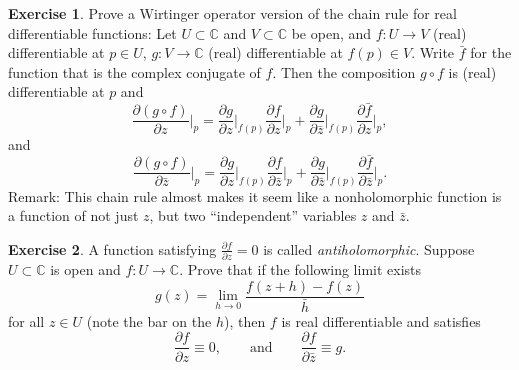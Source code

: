 \documentclass[12pt,openany]{book}
\newcommand{\C}{{\mathbb{C}}}
\newcommand{\myindex}[1]{#1\index{#1}}
\newcommand{\myquote}[1]{``#1''}
\theoremstyle{plain}
\theoremstyle{remark}
\theoremstyle{definition}
\newenvironment{exbox}{%
    \def\FrameCommand{\vrule width 1pt \relax\hspace{10pt}}%
    \MakeFramed{\advance\hsize-\width\FrameRestore}%
}{%
    \endMakeFramed
}
\theoremstyle{exercise}
\newtheorem{exercise}{Exercise}[section]
\theoremstyle{example}
\begin{document}
\begin{exbox}
\begin{exercise}%
\label{exercise:wirtingerchain}
Prove a Wirtinger operator version of
the chain rule
for real differentiable
functions:  Let $U \subset \C$ and $V \subset \C$ be open, and $f \colon U \to V$
(real) differentiable at $p \in U$, $g \colon V \to \C$ (real) differentiable
at $f(p) \in V$.  Write $\bar{f}$ for the function that is the complex conjugate
of $f$.  Then the composition $g \circ f$
is (real) differentiable at $p$ and
\begin{equation*}
\frac{\partial (g \circ f)}{\partial z}\Big|_p
=
\frac{\partial g}{\partial z}\Big|_{f(p)}
\frac{\partial f}{\partial z}\Big|_p
+
\frac{\partial g}{\partial \bar{z}}\Big|_{f(p)}
\frac{\partial \bar{f}}{\partial z}\Big|_p ,
\end{equation*}
and
\begin{equation*}
\frac{\partial (g \circ f)}{\partial \bar{z}}\Big|_p
=
\frac{\partial g}{\partial z}\Big|_{f(p)}
\frac{\partial f}{\partial \bar{z}}\Big|_p
+
\frac{\partial g}{\partial \bar{z}}\Big|_{f(p)}
\frac{\partial \bar{f}}{\partial \bar{z}}\Big|_p .
\end{equation*}
Remark: This chain rule almost makes it seem like a nonholomorphic function is a
function of not just $z$, but two \myquote{independent} variables $z$ and
$\bar{z}$.
\end{exercise}

\begin{exercise}
A function satisfying $\frac{\partial f}{\partial z} = 0$ is called
\emph{\myindex{antiholomorphic}}.
Suppose $U \subset \C$ is open and $f \colon U \to \C$.
Prove that if the following
limit exists
\begin{equation*}
g(z) = 
\lim_{h \to 0}
\frac{f(z+h)-f(z)}{\bar{h}}
\end{equation*}
for all $z \in U$ (note the bar on the $h$),
then $f$ is real differentiable and satisfies
\begin{equation*}
\frac{\partial f}{\partial z} \equiv 0, \qquad \text{and} \qquad
\frac{\partial f}{\partial \bar{z}} \equiv g .
\end{equation*}
\end{exercise}


\end{exbox}
\end{document}
